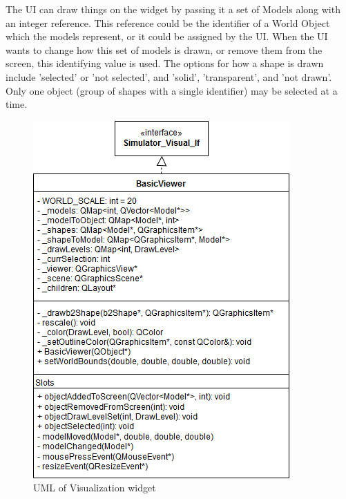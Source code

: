 The UI can draw things on the widget by passing it a set of Models along with an integer reference. This reference could be the identifier of a World Object which the models represent, or it could be assigned by the UI. When the UI wants to change how this set of models is drawn, or remove them from the screen, this identifying value is used.
The options for how a shape is drawn include 'selected' or 'not selected', and 'solid', 'transparent', and 'not drawn'. Only one object (group of shapes with a single identifier) may be selected at a time.
 \begin{figure}
 	\begin{center}
 	\includegraphics[scale=0.5]{./images_design/uml/BasicViewer}
 	\caption{UML of Visualization widget\label{uml:viewwidget}}
 	\end{center}
 \end{figure}
 

